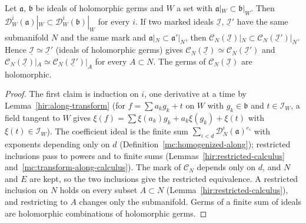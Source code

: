 \begin{lemma}
\label{mc:coefficient-representatives-along}
\leanok
Let \(\mathfrak a\), \(\mathfrak b\) be ideals of holomorphic germs and \(W\) a set with \(\mathfrak a|_W\subset\mathfrak b|_W\). Then
\(\mathcal D^i_W(\mathfrak a)|_W\subset\mathcal D^i_W(\mathfrak b)|_W\) for every \(i\). If two marked ideals \(\underline{\mathcal I}\), \(\underline{\mathcal I}'\) have the same submanifold
\(N\) and the same mark and \(\mathfrak a|_N\subset\mathfrak a'|_N\), then \(\mathcal C_N(\underline{\mathcal I})|_N\subset\mathcal C_N(\underline{\mathcal I}')|_N\). Hence
\(\underline{\mathcal I}\simeq\underline{\mathcal I}'\) (ideals of holomorphic germs) gives \(\mathcal C_N(\underline{\mathcal I})\simeq\mathcal C_N(\underline{\mathcal I}')\) and
\(\mathcal C_N(\underline{\mathcal I})|_A\simeq\mathcal C_N(\underline{\mathcal I}')|_A\) for every \(A\subset N\). The germs of \(\mathcal C_N(\underline{\mathcal I})\) are holomorphic.
\end{lemma}
\begin{proof}
\leanok
The first claim is induction on \(i\), one derivative at a time by Lemma~\ref{hir:along-transform} (for \(f=\sum a_kg_k+t\) on \(W\) with \(g_k\in\mathfrak b\) and
\(t\in\mathcal I_W\), a field tangent to \(W\) gives \(\xi(f)=\sum\xi(a_k)g_k+a_k\xi(g_k)+\xi(t)\) with \(\xi(t)\in\mathcal I_W\)). The coefficient ideal is the finite sum
\(\sum_{i<d}\mathcal D^i_N(\mathfrak a)^{e_i}\) with exponents depending only on \(d\) (Definition~\ref{mc:homogenized-along}); restricted inclusions pass to powers and to
finite sums (Lemmas~\ref{hir:restricted-calculus} and~\ref{mc:transform-along-calculus}). The mark of \(\mathcal C_N\) depends only on \(d\), and \(N\) and \(E\) are kept, so
the two inclusions give the restricted equivalence. A restricted inclusion on \(N\) holds on every subset \(A\subset N\) (Lemma~\ref{hir:restricted-calculus}), and
restricting to \(A\) changes only the submanifold. Germs of a finite sum of ideals are holomorphic combinations of holomorphic germs.
\end{proof}

